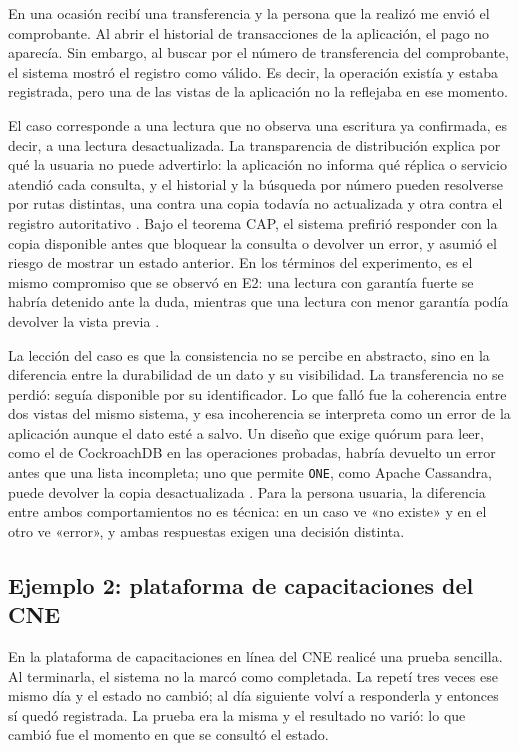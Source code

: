 \documentclass[11pt,a4paper]{article}
\newcommand{\sistemaA}{CockroachDB}      %
\newcommand{\sistemaB}{Apache Cassandra} %
\begin{document}
En una ocasión recibí una transferencia y la persona que la realizó me envió el
comprobante. Al abrir el historial de transacciones de la aplicación, el pago no
aparecía. Sin embargo, al buscar por el número de transferencia del comprobante, el
sistema mostró el registro como válido. Es decir, la operación existía y estaba
registrada, pero una de las vistas de la aplicación no la reflejaba en ese momento.

El caso corresponde a una lectura que no observa una escritura ya confirmada, es
decir, a una lectura desactualizada. La transparencia de distribución explica por qué
la usuaria no puede advertirlo: la aplicación no informa qué réplica o servicio
atendió cada consulta, y el historial y la búsqueda por número pueden resolverse por
rutas distintas, una contra una copia todavía no actualizada y otra contra el
registro autoritativo \cite{apacheCassandraGuarantees,ferreira2024consistency}. Bajo
el teorema CAP, el sistema prefirió responder con la copia disponible antes que
bloquear la consulta o devolver un error, y asumió el riesgo de mostrar un estado
anterior. En los términos del experimento, es el mismo compromiso que se observó en
E2: una lectura con garantía fuerte se habría detenido ante la duda, mientras que una
lectura con menor garantía podía devolver la vista previa
\cite{cockroachlabsReplication,apacheCassandraGuarantees}.

La lección del caso es que la consistencia no se percibe en abstracto, sino en la
diferencia entre la durabilidad de un dato y su visibilidad. La transferencia no se
perdió: seguía disponible por su identificador. Lo que falló fue la coherencia entre
dos vistas del mismo sistema, y esa incoherencia se interpreta como un error de la
aplicación aunque el dato esté a salvo. Un diseño que exige quórum para leer, como el
de \sistemaA{} en las operaciones probadas, habría devuelto un error antes que una
lista incompleta; uno que permite \texttt{ONE}, como \sistemaB{}, puede devolver la
copia desactualizada \cite{cockroachlabsReplication,apacheCassandraDynamo}. Para la
persona usuaria, la diferencia entre ambos comportamientos no es técnica: en un caso
ve «no existe» y en el otro ve «error», y ambas respuestas exigen una decisión
distinta.

\subsection{Ejemplo 2: plataforma de capacitaciones del CNE}

En la plataforma de capacitaciones en línea del CNE realicé una prueba sencilla. Al
terminarla, el sistema no la marcó como completada. La repetí tres veces ese mismo
día y el estado no cambió; al día siguiente volví a responderla y entonces sí quedó
registrada. La prueba era la misma y el resultado no varió: lo que cambió fue el
momento en que se consultó el estado.
\end{document}
